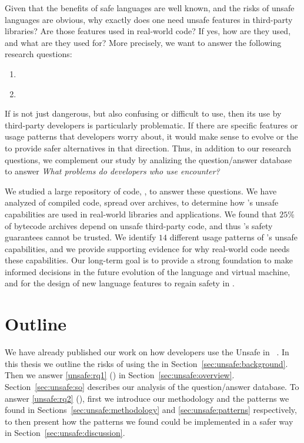 Given that the benefits of safe languages are well known,
and the risks of unsafe languages are obvious,
why exactly does one need unsafe features in third-party libraries?
Are those features used in real-world code?
If yes, how are they used, and what are they used for?
More precisely, we want to answer the following research questions:

\begin{enumerate}[label=$RQ/U\arabic*:$,ref=$RQ/U\arabic*$,leftmargin=3.4\parindent]
\item\label{unsafe:rq1} {\bf \urqA} \urqAdesc{}
\item\label{unsafe:rq2} {\bf \urqB} \urqBdesc{}
\end{enumerate}

If \unsafe{} is not just dangerous,
but also confusing or difficult to use,
then its use by third-party developers is particularly problematic.
If there are specific \unsafe{} features or usage patterns that developers worry about,
it would make sense to evolve \java{} or the \jvm{} to provide safer alternatives in that direction.
Thus, in addition to our research questions,
we complement our study by analizing the \stackoverflow{} question/answer database
to answer \emph{What problems do developers who use \unsafe{} encounter?}

We studied a large repository of \java{} code, \mavencentral{},
to answer these questions.
We have analyzed \statreposize{} of compiled \java{} code,
spread over \statrepouniquearts{} \java{} archives,
to determine how \java{}'s unsafe capabilities are used in real-world
libraries and applications.
We found that $25\%$ of \java{} bytecode archives depend on unsafe
third-party \java{} code, and thus \java{}'s safety
guarantees cannot be trusted.
We identify $14$ different usage patterns of \java{}'s unsafe capabilities,
and we provide supporting evidence for why real-world code needs these capabilities.
Our long-term goal is to provide a strong foundation
to make informed decisions in the future evolution of the \java{} language and virtual machine,
and for the design of new language features to regain safety in \java{}.

\section*{Outline}

We have already published our work on how developers use the Unsafe \api{} in \java{}~\citep{mastrangeloUseYourOwn2015}.
In this thesis we outline the risks of using the \unsafe{} \api{} in Section~\ref{sec:unsafe:background}.
Then we answer \ref{unsafe:rq1} (\urqA{}) in Section~\ref{sec:unsafe:overview}.
Section~\ref{sec:unsafe:so} describes our analysis of the \stackoverflow{} question/answer database.
To answer \ref{unsafe:rq2} (\urqB{}),
first we introduce our methodology and the patterns we found in Sections~\ref{sec:unsafe:methodology} and \ref{sec:unsafe:patterns} respectively,
to then present how the patterns we found could be implemented in a safer way in Section~\ref{sec:unsafe:discussion}.







